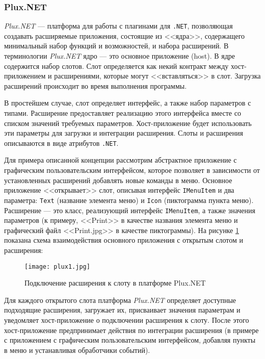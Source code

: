 \subsubsection{Plux.NET}

{\it Plux.NET} --- платформа для работы с плагинами для {\tt .NET}, позволяющая создавать расширяемые приложения, состоящие из <<ядра>>, содержащего минимальный набор функций и возможностей, и набора расширений. В терминологии {\it Plux.NET} ядро --- это основное приложение (host). В ядре содержится набор слотов. Слот определяется как некий контракт между хост-приложением и расширениями, которые могут <<вставляться>> в слот. Загрузка расширений происходит во время выполнения программы. 

В простейшем случае, слот определяет интерфейс, а также набор параметров с типами. Расширение предоставляет реализацию этого интерфейса вместе со списком значений требуемых параметров. Хост-приложение  будет использовать эти параметры для загрузки и интеграции расширения. Слоты и расширения описываются в виде атрибутов {\tt .NET}.

Для примера описанной концепции рассмотрим абстрактное приложение с графическим пользовательским интерфейсом, которое позволяет в зависимости от установленных расширений добавлять новые команды в меню. Основное приложение <<открывает>> слот, описывая интерфейс {\tt IMenuItem} и два параметра: {\tt Text} (название элемента меню) и {\tt Icon} (пиктограмма пункта меню). Расширение --- это класс, реализующий интерфейс {\tt IMenuItem}, а также значения параметров (к примеру, <<Print>> в качестве названия элемента меню и графический файл <<Print.jpg>> в качестве пиктограммы). На рисунке \ref{plux-scheme} показана схема взаимодействия основного приложения с открытым слотом и расширения:

\begin{figure}[!h]
    \centering
    \texttt{[image: plux1.jpg]}
    \caption{Подключение расширения к слоту в платформе Plux.NET}
    \label{plux-scheme}
\end{figure}


Для каждого открытого слота платформа {\it Plux.NET} определяет доступные подходящие расширения, загружает их, присваивает значения параметрам и уведомляет хост-приложение о подключении расширения к слоту. После этого хост-приложение предпринимает действия по интеграции расширения (в примере с приложением с графическим пользовательским интерфейсом, добавляя пункты в меню и устанавливая обработчики событий).